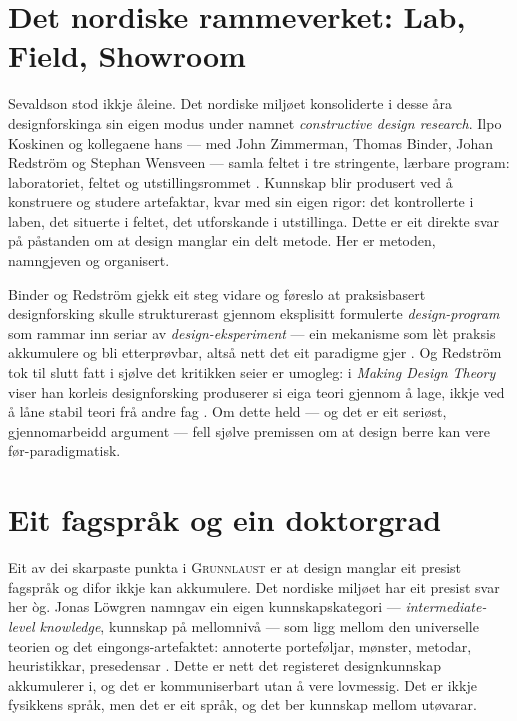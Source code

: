 \section{Det nordiske rammeverket: Lab, Field, Showroom}

Sevaldson stod ikkje åleine. Det nordiske miljøet konsoliderte i desse åra designforskinga sin eigen modus under namnet \emph{constructive design research}. Ilpo Koskinen og kollegaene hans — med John Zimmerman, Thomas Binder, Johan Redström og Stephan Wensveen — samla feltet i tre stringente, lærbare program: laboratoriet, feltet og utstillingsrommet \autocite{koskinen2011constructive}. Kunnskap blir produsert ved å konstruere og studere artefaktar, kvar med sin eigen rigor: det kontrollerte i laben, det situerte i feltet, det utforskande i utstillinga. Dette er eit direkte svar på påstanden om at design manglar ein delt metode. Her er metoden, namngjeven og organisert.

Binder og Redström gjekk eit steg vidare og føreslo at praksisbasert designforsking skulle strukturerast gjennom eksplisitt formulerte \emph{design-program} som rammar inn seriar av \emph{design-eksperiment} — ein mekanisme som lèt praksis akkumulere og bli etterprøvbar, altså nett det eit paradigme gjer \autocite{binder2006exemplary}. Og Redström tok til slutt fatt i sjølve det kritikken seier er umogleg: i \textit{Making Design Theory} viser han korleis designforsking produserer si eiga teori gjennom å lage, ikkje ved å låne stabil teori frå andre fag \autocite{redstrom2017making}. Om dette held — og det er eit seriøst, gjennomarbeidd argument — fell sjølve premissen om at design berre kan vere før-paradigmatisk.

\section{Eit fagspråk og ein doktorgrad}

Eit av dei skarpaste punkta i \textsc{Grunnlaust} er at design manglar eit presist fagspråk og difor ikkje kan akkumulere. Det nordiske miljøet har eit presist svar her òg. Jonas Löwgren namngav ein eigen kunnskapskategori — \emph{intermediate-level knowledge}, kunnskap på mellomnivå — som ligg mellom den universelle teorien og det eingongs-artefaktet: annoterte porteføljar, mønster, metodar, heuristikkar, presedensar \autocite{lowgren2013intermediate}. Dette er nett det registeret designkunnskap akkumulerer i, og det er kommuniserbart utan å vere lovmessig. Det er ikkje fysikkens språk, men det er eit språk, og det ber kunnskap mellom utøvarar.

